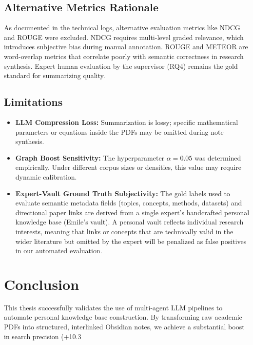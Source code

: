 \documentclass[11pt, a4paper, oneside]{article}
\begin{document}
\subsection{Alternative Metrics Rationale}
As documented in the technical logs, alternative evaluation metrics like NDCG and ROUGE were excluded. NDCG requires multi-level graded relevance, which introduces subjective bias during manual annotation. ROUGE and METEOR are word-overlap metrics that correlate poorly with semantic correctness in research synthesis. Expert human evaluation by the supervisor (RQ4) remains the gold standard for summarizing quality.

\subsection{Limitations}
\begin{itemize}
    \item \textbf{LLM Compression Loss:} Summarization is lossy; specific mathematical parameters or equations inside the PDFs may be omitted during note synthesis.
    \item \textbf{Graph Boost Sensitivity:} The hyperparameter $\alpha = 0.05$ was determined empirically. Under different corpus sizes or densities, this value may require dynamic calibration.
    \item \textbf{Expert-Vault Ground Truth Subjectivity:} The gold labels used to evaluate semantic metadata fields (topics, concepts, methods, datasets) and directional paper links are derived from a single expert's handcrafted personal knowledge base (Emile's vault). A personal vault reflects individual research interests, meaning that links or concepts that are technically valid in the wider literature but omitted by the expert will be penalized as false positives in our automated evaluation.
\end{itemize}

\section{Conclusion}
\label{sec:conclusion}
This thesis successfully validates the use of multi-agent LLM pipelines to automate personal knowledge base construction. By transforming raw academic PDFs into structured, interlinked Obsidian notes, we achieve a substantial boost in search precision (+10.3%


\nocite{*}


\newpage
\appendix

\end{document}
